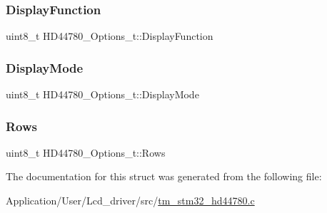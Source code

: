 \subsubsection{\texorpdfstring{Display\+Function}{DisplayFunction}}
{\footnotesize\ttfamily uint8\+\_\+t H\+D44780\+\_\+\+Options\+\_\+t\+::\+Display\+Function}

\mbox{\label{struct_h_d44780___options__t_a1b35879fbf92ef75056a03d7480adeba}} 
\subsubsection{\texorpdfstring{Display\+Mode}{DisplayMode}}
{\footnotesize\ttfamily uint8\+\_\+t H\+D44780\+\_\+\+Options\+\_\+t\+::\+Display\+Mode}

\mbox{\label{struct_h_d44780___options__t_a68d23667da79372ed89149bf8457caab}} 
\subsubsection{\texorpdfstring{Rows}{Rows}}
{\footnotesize\ttfamily uint8\+\_\+t H\+D44780\+\_\+\+Options\+\_\+t\+::\+Rows}



The documentation for this struct was generated from the following file\+:\begin{DoxyCompactItemize}
\item 
Application/\+User/\+Lcd\+\_\+driver/src/\hyperlink{tm__stm32__hd44780_8c}{tm\+\_\+stm32\+\_\+hd44780.\+c}\end{DoxyCompactItemize}
